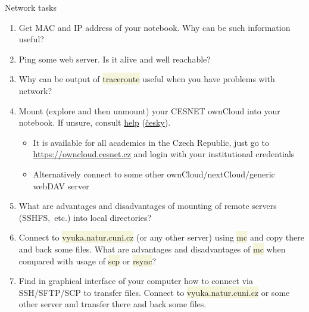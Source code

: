 \documentclass[compress, xelatex, 11pt, xcolor=svgnames, aspectratio=169, url={hyphens, lowtilde}]{beamer}
\renewcommand{\texttt}[1]{\colorbox{Beige}{{\ttfamily #1}}}
\begin{document}
\begin{frame}[allowframebreaks]{Network tasks}
\begin{enumerate}
\begin{itemize}
			\item Explore help of \texttt{rsync}. Can you find there some useful parameters?
		\end{itemize}
		\item Get MAC and IP address of your notebook. Why can be such information useful?
		\item Ping some web server. Is it alive and well reachable?
		\item Why can be output of \texttt{traceroute} useful when you have problems with network?
		\item Mount (explore and then unmount) your CESNET ownCloud into your notebook. If unsure, consult \href{https://du.cesnet.cz/en/navody/owncloud/start}{help} (\href{https://du.cesnet.cz/cs/navody/owncloud/start}{česky}).
		\begin{itemize}
			\item It is available for all academics in the Czech Republic, just go to \url{https://owncloud.cesnet.cz} and login with your institutional credentials
			\item Alternatively connect to some other ownCloud/nextCloud/generic webDAV server
		\end{itemize}
		\item What are advantages and disadvantages of mounting of remote servers (SSHFS,~etc.) into local directories?
		\item Connect to \texttt{vyuka.natur.cuni.cz} (or any other server) using \texttt{mc} and copy there and back some files. What are advantages and disadvantages of \texttt{mc} when compared with usage of \texttt{scp} or \texttt{rsync}?
		\item Find in graphical interface of your computer how to connect via SSH/SFTP/SCP to transfer files. Connect to \texttt{vyuka.natur.cuni.cz} or some other server and transfer there and back some files.
	\end{enumerate}
\end{frame}
\end{document}
